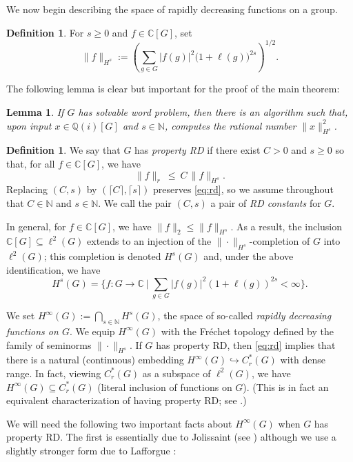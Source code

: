 \documentclass{amsart}
\newcommand{\C}{\mathbb{C}}
\newcommand{\N}{\mathbb{N}}
\newcommand{\Cr}{C^*_r(G)}
\theoremstyle{plain}
\newtheorem{lemma}[theorem]{Lemma}
\theoremstyle{definition}
\newtheorem{definition}[theorem]{Definition}
\numberwithin{equation}{section}
\begin{document}
We now begin describing the space of rapidly decreasing functions on a group.

\begin{definition}\label{def:rd}
For $s\ge0$ and $f\in \mathbb{C}[G]$, set
\[
\|f\|_{H^s}:=\left(\sum_{g\in G}|f(g)|^2\big(1+\ell(g)\big)^{2s}\right)^{1/2}.
\]
\end{definition}

The following lemma is clear but important for the proof of the main theorem:

\begin{lemma}\label{sobolevcomp}
If $G$ has solvable word problem, then there is an algorithm such that, upon input $x\in \mathbb{Q}(i)[G]$ and $s\in \N$, computes the rational number $\|x\|_{H^s}^2$.
\end{lemma}

\begin{definition}
We say that $G$ has \emph{property RD} if there exist $C>0$ and $s\ge0$ so that, for all $f\in \mathbb{C}[G]$, we have
\begin{equation}\label{eq:rd}
\|f\|_r\ \le\ C\,\|f\|_{H^s}.
\end{equation}
Replacing $(C,s)$ by $(\lceil C\rceil,\lceil s\rceil)$ preserves \eqref{eq:rd}, so we assume throughout that $C\in\N$ and $s\in\N$.  We call the pair $(C,s)$ a pair of \emph{RD constants} for $G$.
\end{definition}

In general, for $f\in \mathbb{C}[G]$, we have $\|f\|_2\le\|f\|_{H^s}$.  As a result, the inclusion $\C[G]\subseteq\ell^2(G)$ extends to an injection of the $\|\cdot\|_{H^s}$-completion of $G$ into $\ell^2(G)$; this completion is denoted $H^s(G)$ and, under the above identification, we have
\[
H^s(G)=\Big\{f:G\to\C\ \Big|\ \textstyle\sum_{g\in G}|f(g)|^2(1+\ell(g))^{2s}<\infty\Big\}.
\] 

We set $H^\infty(G):=\bigcap_{s\in\N}H^s(G)$, the space of so-called \emph{rapidly decreasing functions on $G$}.  We equip $H^\infty(G)$ with the Fr\'echet topology defined by the family of seminorms $\|\cdot\|_{H^s}$.  If $G$ has property RD, then \eqref{eq:rd} implies that there is a natural (continuous) embedding $H^\infty(G)\hookrightarrow\Cr$ with dense range.  In fact, viewing $C^*_r(G)$ as a subspace of $\ell^2(G)$, we have $H^\infty(G)\subseteq C^*_r(G)$ (literal inclusion of functions on $G$).  (This is in fact an equivalent characterization of having property RD; see \cite[Proposition 4.1]{chatterji}.)

We will need the following two important facts about $H^\infty(G)$ when $G$ has property RD.  The first is essentially due to Jolissaint (see \cite[Lemma 1.2.4]{jolissaint}) although we use a slightly stronger form due to Lafforgue \cite{lafforgue}:
\end{document}
